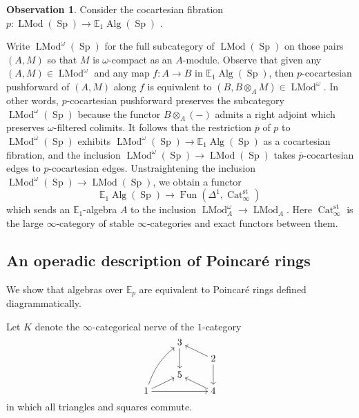 \documentclass{article}
\DeclareMathOperator{\Alg}{Alg}
\DeclareMathOperator{\Cat}{Cat} %
\DeclareMathOperator{\Fun}{Fun} %
\DeclareMathOperator{\LMod}{LMod} %
\DeclareMathOperator{\Spectra}{Sp} %
\newcommand{\EE}{\mathbb{E}}
\theoremstyle{definition}
\newtheorem{observation}[equation]{Observation}
\begin{document}
\begin{observation}\label{obs:cpct_modules_to_all_modules}
    Consider the cocartesian fibration $ p \colon \LMod\left(\Spectra\right) \to \EE_1\Alg\left(\Spectra\right) $ \cite[Corollary 4.2.3.7(3)]{LurHA}. 

    Write $ \LMod^\omega\left(\Spectra\right) $ for the full subcategory of $ \LMod\left(\Spectra\right) $ on those pairs $ (A, M) $ so that $ M $ is $ \omega $-compact as an $ A $-module. 
    Observe that given any $ (A, M) \in \LMod^\omega $ and any map $ f \colon A \to B $ in $ \EE_1 \Alg\left(\Spectra\right) $, then $ p $-cocartesian pushforward of $ (A,M) $ along $ f $ is equivalent to $ (B,B \otimes_A M) \in \LMod^\omega $. 
    In other words, $ p $-cocartesian pushforward preserves the subcategory $ \LMod^\omega\left(\Spectra\right) $ because the functor $ B \otimes_A (-) $ admits a right adjoint which preserves $ \omega $-filtered colimits. 
    It follows that the restriction $ \overline{p} $ of $ p $ to $ \LMod^\omega\left(\Spectra\right) $ exhibits $ \LMod^\omega\left(\Spectra\right) \to \EE_1\Alg\left(\Spectra\right) $ as a cocartesian fibration, and the inclusion $ \LMod^\omega\left(\Spectra\right) \to \LMod\left(\Spectra\right) $ takes $ \overline{p} $-cocartesian edges to $ p $-cocartesian edges. 
    Unstraightening the inclusion $ \LMod^\omega\left(\Spectra\right) \to \LMod\left(\Spectra\right) $, we obtain a functor 
    \begin{equation*}
        \EE_1\Alg\left(\Spectra\right) \to \Fun\left(\Delta^1,\Cat_\infty^{\mathrm{st}}\right)
    \end{equation*}
    which sends an $ \EE_1 $-algebra $ A $ to the inclusion $ \LMod^\omega_A \to \LMod_A $. 
    Here $ \Cat_\infty^{\mathrm{st}} $ is the large $ \infty $-category of stable $ \infty $-categories and exact functors between them. 
\end{observation}

\subsection{An operadic description of Poincaré rings}
We show that algebras over $ \mathbb{E}_p $ are equivalent to Poincaré rings defined diagrammatically. 

Let $ K $ denote the $ \infty $-categorical nerve of the $ 1 $-category
\begin{equation*}%
\begin{tikzcd}[cramped, row sep=tiny]
    & 3 \ar[dd] & \\
    & & 2 \ar[dd] \ar[lu] \\
    & 5 & \\
    1  \ar[rr] \ar[ru] \ar[ruuu, bend left=15] & & 4 \ar[lu]
\end{tikzcd}
\end{equation*}
in which all triangles and squares commute. 
\end{document}
